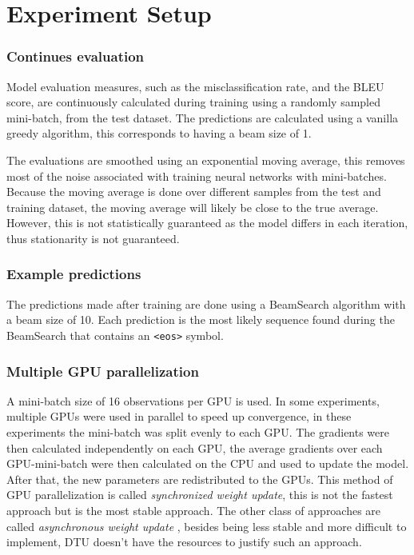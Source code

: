 
\section{Experiment Setup}

\subsubsection{Continues evaluation}
Model evaluation measures, such as the misclassification rate, and the BLEU score, are continuously calculated during training using a randomly sampled mini-batch, from the test dataset. The predictions are calculated using a vanilla greedy algorithm, this corresponds to having a beam size of 1.

The evaluations are smoothed using an exponential moving average, this removes most of the noise associated with training neural networks with mini-batches. Because the moving average is done over different samples from the test and training dataset, the moving average will likely be close to the true average. However, this is not statistically guaranteed as the model differs in each iteration, thus stationarity is not guaranteed.

\subsubsection{Example predictions}
The predictions made after training are done using a BeamSearch algorithm with a beam size of 10. Each prediction is the most likely sequence found during the BeamSearch that contains an \texttt{<eos>} symbol.

\subsubsection{Multiple GPU parallelization}
A mini-batch size of 16 observations per GPU is used. In some experiments, multiple GPUs were used in parallel to speed up convergence, in these experiments the mini-batch was split evenly to each GPU. The gradients were then calculated independently on each GPU, the average gradients over each GPU-mini-batch were then calculated on the CPU and used to update the model. After that, the new parameters are redistributed to the GPUs. This method of GPU parallelization is called \textit{synchronized weight update}, this is not the fastest approach but is the most stable approach. The other class of approaches are called \textit{asynchronous weight update} \cite{async-sgd}, besides being less stable and more difficult to implement, DTU doesn't have the resources to justify such an approach.


